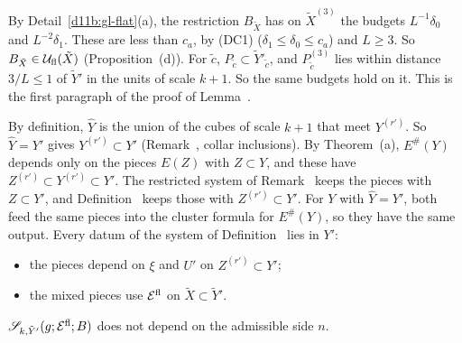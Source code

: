 \begin{step}
By Detail~\ref{d11b:gl-flat}(a), the restriction $B_{\tilde X}$ has on $\tilde X^{(3)}$ the budgets $L^{-1}\delta_0$ and $L^{-2}\delta_1$. These are less than $c_a$, by (DC1) ($\delta_1\le\delta_0\le c_a$) and $L\ge3$. So $B_{\tilde X}\in\mathcal U_{\rm fl}(\tilde X)$ (Proposition~(d)). For $\tilde c$, $P_{\tilde c}\subset\tilde Y'_{\tilde c}$, and $P_{\tilde c}^{(3)}$ lies within distance $3/L\le1$ of $\tilde Y'$ in the units of scale $k+1$. So the same budgets hold on it. This is the first paragraph of the proof of Lemma~.
\end{step}

\begin{step}
By definition, $\hat Y$ is the union of the cubes of scale $k+1$ that meet $Y^{(r')}$. So $\hat Y=Y'$ gives $Y^{(r')}\subset Y'$ (Remark~, collar inclusions). By Theorem~(a), $E^\#(Y)$ depends only on the pieces $E(Z)$ with $Z\subset Y$, and these have $Z^{(r')}\subset Y^{(r')}\subset Y'$. The restricted system of Remark~ keeps the pieces with $Z\subset Y'$, and Definition~ keeps those with $Z^{(r')}\subset Y'$. For $Y$ with $\hat Y=Y'$, both feed the same pieces into the cluster formula for $E^\#(Y)$, so they have the same output. Every datum of the system of Definition~ lies in $Y'$:
\begin{itemize}
\item the pieces depend on $\xi$ and $U'$ on $Z^{(r')}\subset Y'$;
\item the mixed pieces use $\mathcal E^{\rm fl}$ on $\tilde X\subset\tilde Y'$.
\end{itemize}
\end{step}

\begin{detail}\label{d11b:gl-functional-a}
$\mathscr S_{k,\tilde Y'}(g;\mathcal E^{\rm fl};B)$ does not depend on the admissible side $n$.
\end{detail}

